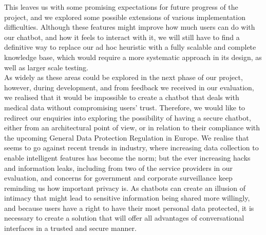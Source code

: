 This leaves us with some promising expectations for future progress of the project, and we explored some possible extensions of various implementation difficulties. Although these features might improve how much users can do with our chatbot, and how it feels to interact with it, we will still have to find a definitive way to replace our ad hoc heuristic with a fully scalable and complete knowledge base, which would require a more systematic approach in its design, as well as larger scale testing. \\
As widely as these areas could be explored in the next phase of our project, however, during development, and from feedback we received in our evaluation, we realised that it would be impossible to create a chatbot that deals with medical data without compromising users' trust. Therefore, we would like to redirect our enquiries into exploring the possibility of having a secure chatbot, either from an architectural point of view, or in relation to their compliance with the upcoming General Data Protection Regulation in Europe. We realise that seems to go against recent trends in industry, where increasing data collection to enable intelligent features has become the norm; but the ever increasing hacks and information leaks, including from two of the service providers in our evaluation, and concerns for government and corporate surveillance keep reminding us how important privacy is. As chatbots can create an illusion of intimacy that might lead to sensitive information being shared more willingly, and because users have a right to have their most personal data protected, it is necessary to create a solution that will offer all advantages of conversational interfaces in a trusted and secure manner.
